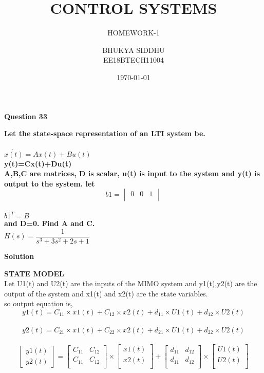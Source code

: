 \documentclass{beamer}
\begin{document}
\title[EE2227]{CONTROL SYSTEMS}
\subtitle{HOMEWORK-1}
\author{BHUKYA SIDDHU\\ EE18BTECH11004}
\date{\today}



\begin{frame}
  \titlepage
\end{frame}
\item \textbf{Question 33}
\item \textbf{Let the state-space representation of an LTI system be.
\\
\\ $\dot{x(t)}=Ax(t)+Bu(t)$
\\y(t)=Cx(t)+Du(t)
\\A,B,C are matrices, D is scalar, u(t) is input to the system and y(t) is output to the system. let 
$$b1 =\begin{vmatrix}
 0&0&1\\
\end{vmatrix}
$$ 
\\$b1^T=B$
\\and D=0. Find A and C.
\\$H(s)=\dfrac{1}{s^3+3s^2+2s+1}$}
\\\item \textbf{Solution}
\\\item \textbf{STATE MODEL}
\\Let U1(t) and U2(t) are the inputs of the MIMO system and y1(t),y2(t) are the output of the system and x1(t) and x2(t) are the state variables. 
\\so output equation is,
\begin{equation}
    y1(t)=C_{11}\times x1(t)+C_{12}\times x2(t)+d_{11}\times U1(t)+d_{12}\times U2(t)
\end{equation}
\\
\begin{equation}
    y2(t)=C_{21}\times x1(t)+C_{22}\times x2(t)+d_{21}\times U1(t)+d_{22}\times U2(t)
\end{equation}
\\
\[
\begin{bmatrix}
y1(t)\\
y2(t)
\end{bmatrix}
=
\begin{bmatrix}
C_{11}&C_{12}\\
C_{11}&C_{12}\\
\end{bmatrix}\times \begin{bmatrix}
x1(t)\\
x2(t)\\
\end{bmatrix}
+
\begin{bmatrix}
d_{11}&d_{12}\\
d_{11}&d_{12}\\
\end{bmatrix} \times\begin{bmatrix}
U1(t)\\
U2(t)\\
\end{bmatrix}

\]
\end{document}
